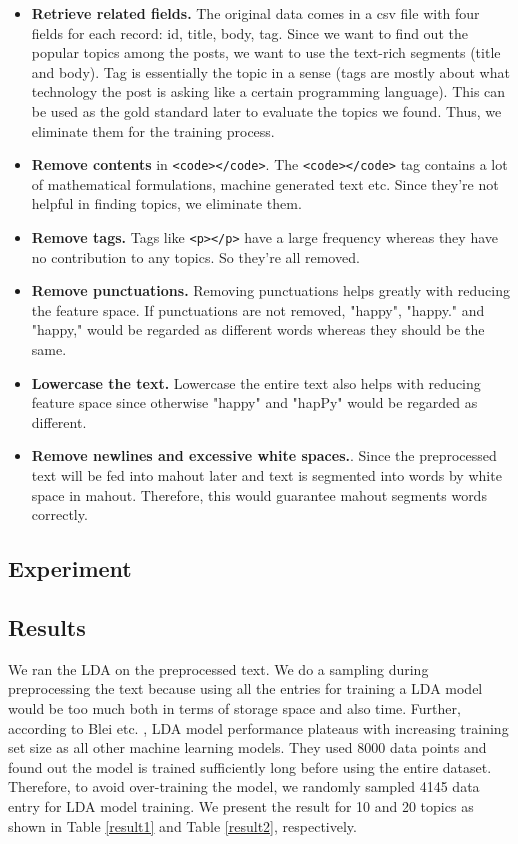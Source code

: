 \documentclass[conference]{IEEEtran}
\begin{document}
\begin{itemize}
	\item \textbf{Retrieve related fields.} The original data comes in a csv file with four fields for each record: id, title, body, tag. Since we want to find out the popular topics among the posts, we want to use the text-rich segments (title and body). Tag is essentially the topic in a sense (tags are mostly about what technology the post is asking like a certain programming language). This can be used as the gold standard later to evaluate the topics we found. Thus, we eliminate them for the training process. 
	\item \textbf{Remove contents} in \verb+<code></code>+. The \verb+<code></code>+ tag contains a lot of mathematical formulations, machine generated text etc. Since they're not helpful in finding topics, we eliminate them.
	\item \textbf{Remove tags.} Tags like \verb+<p></p>+ have a large frequency whereas they have no contribution to any topics. So they're all removed.
	\item \textbf{Remove punctuations.} Removing punctuations helps greatly with reducing the feature space. If punctuations are not removed, "happy", "happy." and "happy," would be regarded as different words whereas they should be the same.
	\item \textbf{Lowercase the text.} Lowercase the entire text also helps with reducing feature space since otherwise "happy" and "hapPy" would be regarded as different.
	\item \textbf{Remove newlines and excessive white spaces.}. Since the preprocessed text will be fed into mahout later and text is segmented into words by white space in mahout. Therefore, this would guarantee mahout segments words correctly.
\end{itemize}

\subsection{Experiment}

\subsection{Results}

We ran the LDA on the preprocessed text. We do a sampling during preprocessing the text because using all the entries for training a LDA model would be too much both in terms of storage space and also time. Further, according to Blei etc. \cite{blei2003latent}, LDA model performance plateaus with increasing training set size as all other machine learning models. They used 8000 data points and found out the model is trained sufficiently long before using the entire dataset. Therefore, to avoid over-training the model, we randomly sampled 4145 data entry for LDA model training. We present the result for 10 and 20 topics as shown in Table \ref{result1} and Table \ref{result2}, respectively.
\end{document}
